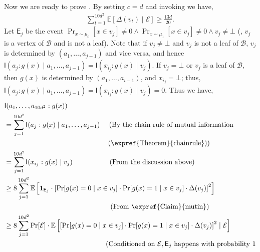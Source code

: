\documentclass{toc}
\newcommand{\clB}{\mathcal{B}}
\newcommand{\clE}{\mathcal{E}}
\newcommand{\E}{\mathbb{E}}
\newcommand{\I}{\mathsf{I}}
\begin{document}
Now we are ready to prove . By setting $c=d$ and invoking  we have,
\begin{align}
\sum_{t=1}^{10d^2} \E[\Delta(v_t) \mid \clE] \geq \frac{13d}{20}. \label{deltabound}
\end{align}
Let $\mathsf{E}_j$ be the event $\Pr_{x \sim \mu_0}[x \in v_j] \neq 0 \wedge \Pr_{x \sim \mu_1}[x \in v_j] \neq 0 \wedge v_j \neq \bot$ (\ie, $v_j$ is a vertex of $\clB$ and is not a leaf). Note that if $v_j \neq \bot$ and $v_j$ is not a leaf of $\clB$, $v_j$ is determined by $(a_1, \ldots, a_{j-1})$ and vice versa, and hence $\I(a_j:g(x) \mid a_1, \ldots, a_{j-1})=\I(x_{i_j}:g(x) \mid v_j)$. If $v_j=\bot$ or $v_j$ is a leaf of $\clB$, then $g(x)$ is determined by $(a_1, \ldots, a_{i-1})$, and $x_{i_j}=\bot$; thus, $\I(a_j:g(x) \mid a_1, \ldots, a_{j-1})=\I(x_{i_j}:g(x) \mid v_j)=0$. Thus we have,
\begin{align}
&\I(a_1, \ldots, a_{10d^2}:g(x)) \nonumber \\
&= \sum_{j=1}^{10d^2} \I(a_j:g(x) \mid a_1, \ldots, a_{j-1}) \mbox{\ \ \ \ (By the chain rule of mutual information} \nonumber \\
&\mbox{\ \ \ \ \ \ \ \ \ \ \ \ \ \ \ \ \ \ \ \ \  \ \ \ \ \ \ \ \ \ \ \ \ \ \ \ \ \ \ \ \ \ \ \ \ (\expref{Theorem}{chainrule}))}\nonumber \\
&= \sum_{j=1}^{10d^2} \I(x_{i_j}:g(x) \mid v_j) \mbox{\ \ \ \ \ \ \ \ \ \ \ \ \ \ \ \ (From the discussion above)} \nonumber \\
%
& \geq 8 \sum_{j=1}^{10d^2} \E \left[\mathbf{1}_{\mathsf{E}_j}\cdot\left[\Pr[g(x)=0 \mid x \in v_j] \cdot \Pr[g(x)=1 \mid x \in v_j] \cdot \Delta(v_j)\right]^2\right] \nonumber \\
&\qquad \qquad \qquad \qquad \mbox{\ \ \ \ \ \ \ \ \ \ \ \ \ \ \ \ \ \ \ \ \ \  (From \expref{Claim}{mutin})} \\ \nonumber
&\geq 8 \sum_{j=1}^{10d^2} \Pr[\clE] \cdot \E\left[\left[\Pr[g(x)=0 \mid x \in v_{j}] \cdot \Pr[g(x)=1 \mid x \in v_{j}] \cdot \Delta(v_j)\right]^2 \mid \clE\right] \\ \nonumber
&\qquad \qquad \qquad \qquad \mbox{\ \ \ \ \ \ \ \ \ \ \ \ \ \ \ \ \ \ \ \ (Conditioned on $\clE, \mathsf{E}_j$ happens with probability $1$} \nonumber
\end{align}
\end{document}

